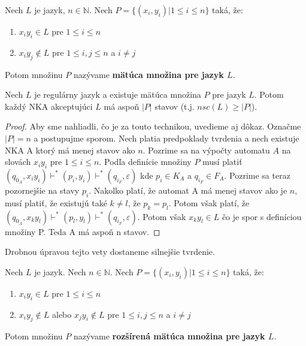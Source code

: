 \begin{definition}
\label{def:fooling_set}
Nech $ L $ je jazyk, $ n \in \mathbb{N} $. Nech $ P = \lbrace (x_{i},y_{i}) | 1 \leq i \leq n \rbrace $ taká, že: 

\begin{enumerate}[label=(\alph*)]
\item $x_{i}y_{i} \in L$ pre $1 \leq i \leq n$
\item $x_{i}y_{j} \notin L$ pre $1 \leq i,j \leq n$ a $i \neq j$
\end{enumerate}

Potom množinu $ P $ nazývame \textbf{mätúca množina pre jazyk $ L $}.
\end{definition}

\begin{theorem}
\label{thm:fooling_set_technique}
Nech $ L $ je regulárny jazyk a existuje mätúca množina $ P $ pre jazyk $ L $. Potom každý NKA akceptujúci $ L $ má aspoň $ |P| $ stavov (t.j. $ nsc(L) \geq |P| $).
\end{theorem}

\begin{proof}
Aby sme nahliadli, čo je za touto technikou, uvedieme aj dôkaz. Označme $ |P|=n $ a postupujme sporom. Nech platia predpoklady tvrdenia a nech existuje NKA A ktorý má menej stavov ako $ n $. Pozrime sa na výpočty automatu $ A $ na slovách $x_{i}y_{i}$ pre $1 \leq i \leq n$. Podľa definície množiny $ P $ musí platiť $ (q_{0_{A}},x_{i}y_{i}) \vdash^{*} (p_{i}, y_{i}) \vdash^{*} (q_{i_{F}}, \varepsilon) $ kde $p_{i} \in K_{A}$ a $q_{i_{F}} \in F_{A}$. Pozrime sa teraz pozornejšie na stavy $ p_{i} $. Nakolko platí, že automat A má menej stavov ako je $ n $, musí platiť, že existujú také $k \neq l $, že $ p_{k}=p_{l}  $. Potom však platí, že $ (q_{0_{A}},x_{k}y_{l}) \vdash^{*} (p_{l}, y_{l}) \vdash^{*} (q_{i_{F}}, \varepsilon)$. Potom však $x_{k}y_{l} \in L$ čo je spor s definíciou množiny P. Teda A má aspoň n stavov.
\end{proof}

Drobnou úpravou tejto vety dostaneme silnejšie tvrdenie.

\begin{definition}
\label{def:extended_fooling_set}
Nech $ L $ je jazyk. Nech $ n \in \mathbb{N} $. Nech $ P = \lbrace (x_{i},y_{i}) | 1 \leq i \leq n \rbrace $ taká, že: 

\begin{enumerate}[label=(\alph*)]
\item $x_{i}y_{i} \in L$ pre $1 \leq i \leq n$
\item $x_{i}y_{j} \notin L$ alebo $x_{j}y_{i} \notin L$ pre $1 \leq i,j \leq n$ a $i \neq j$
\end{enumerate}

Potom množinu $ P $ nazývame \textbf{rozšírená mätúca množina pre jazyk $ L $}.
\end{definition}


